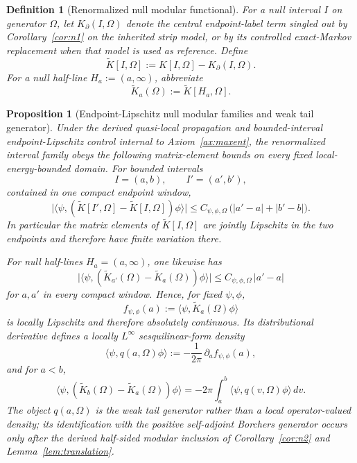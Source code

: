 \documentclass[11pt]{article}
\newtheorem{proposition}[theorem]{Proposition}
\newtheorem{definition}[theorem]{Definition}
\begin{document}
\begin{definition}[Renormalized null modular functional]
For a null interval \(I\) on generator \(\Omega\), let \(K_\partial(I,\Omega)\) denote the central endpoint-label term singled out by Corollary~\ref{cor:n1} on the inherited strip model, or by its controlled exact-Markov replacement when that model is used as reference. Define
\[
\widetilde K[I,\Omega]
:=
K[I,\Omega]-K_\partial(I,\Omega).
\]
For a null half-line \(H_a:=(a,\infty)\), abbreviate
\[
\widetilde K_a(\Omega):=\widetilde K[H_a,\Omega].
\]
\end{definition}

\begin{proposition}[Endpoint-Lipschitz null modular families and weak tail generator]\label{prop:n3}
Under the derived quasi-local propagation and bounded-interval endpoint-Lipschitz control internal to Axiom~\ref{ax:maxent}, the renormalized interval family obeys the following matrix-element bounds on every fixed local-energy-bounded domain. For bounded intervals
\[
I=(a,b),\qquad
I'=(a',b'),
\]
contained in one compact endpoint window,
\[
\bigl|\langle \psi,(\widetilde K[I',\Omega]-\widetilde K[I,\Omega])\phi\rangle\bigr|
\le
C_{\psi,\phi,\Omega}\,\bigl(|a'-a|+|b'-b|\bigr).
\]
In particular the matrix elements of \(\widetilde K[I,\Omega]\) are jointly Lipschitz in the two endpoints and therefore have finite variation there.

For null half-lines \(H_a=(a,\infty)\), one likewise has
\[
\bigl|\langle \psi,(\widetilde K_{a'}(\Omega)-\widetilde K_a(\Omega))\phi\rangle\bigr|
\le
C_{\psi,\phi,\Omega}\,|a'-a|
\]
for \(a,a'\) in every compact window. Hence, for fixed \(\psi,\phi\),
\[
f_{\psi,\phi}(a):=\langle\psi,\widetilde K_a(\Omega)\phi\rangle
\]
is locally Lipschitz and therefore absolutely continuous. Its distributional derivative defines a locally \(L^\infty\) sesquilinear-form density
\[
\langle\psi,q(a,\Omega)\phi\rangle
:=
-\frac{1}{2\pi}\,\partial_a f_{\psi,\phi}(a),
\]
and for \(a<b\),
\[
\langle\psi,(\widetilde K_b(\Omega)-\widetilde K_a(\Omega))\phi\rangle
=
-2\pi\int_a^b \langle\psi,q(v,\Omega)\phi\rangle\,dv.
\]
The object \(q(a,\Omega)\) is the weak tail generator rather than a local operator-valued density; its identification with the positive self-adjoint Borchers generator occurs only after the derived half-sided modular inclusion of Corollary~\ref{cor:n2} and Lemma~\ref{lem:translation}.
\end{proposition}
\end{document}
